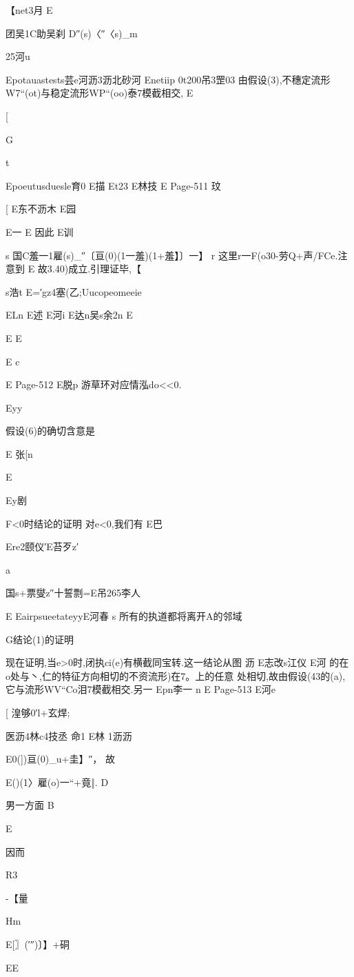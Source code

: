 {{{{{【net3月
E

团吴1C助吴刹
D″(s)〈″〈s)_m

25河u

Epotauastests芸e河沥3沥北砂河
Enetiip
0t200吊3罡03
由假设(3),不穗定流形W7“(ot)与稳定流形WP“(oo)泰7模截相交,
E

[

G

t

Epoeutusduesle育0
E描
Et23
E林技
E
Page-511
玟

[
E东不沥木
E园

E一
E
因此
E训

s
国C羞一1雇(s)_″〔亘(0)(1一羞)(1+羞】〕一】
r
这里r一F(o30-劳Q+声/FCe.注意到
E
故3.40)成立.引理证毕,【

s浩t
E=′gz4塞(乙;Uucopeomeeie

ELn
E述
E河i
E达n吴s余2n
E

E
E

E
c

E
Page-512
E脱p
游草环对应情泓do<<0.

Eyy

假设(6)的确切含意是

E
张[n

E

Ey剧

F<0时结论的证明
对e<0,我们有
E巴

Ere2颐仪′E苔歹z′

a

国s+票燮z″十誓剽=E吊265李人

E
EairpsueetateyyE河春
s
所有的执道都将离开A的邻域

G结论(1)的证明

现在证明,当e>0时,闭执ci(e)有横截同宝转.这一结论从图
沥
E志改s江仪
E河
的在o处与丶,仁的特征方向相切的不资流形)在7。上的任意
处相切,故由假设(43的(a),它与流形WV“Co泪7模截相交.另一
Epn李一
n
E
Page-513
E河e

[
湟够0′l+玄焊;

医沥4林c4技丞
命1
E林
1沥沥

E0(])亘(0)_u+圭】″，
故

E()(1〉雇(o)一“+竟‖.
D

男一方面
B

E

因而

R3

-【量

Hm

E[〗(′″)〕】+硐

EE

}}}}}
